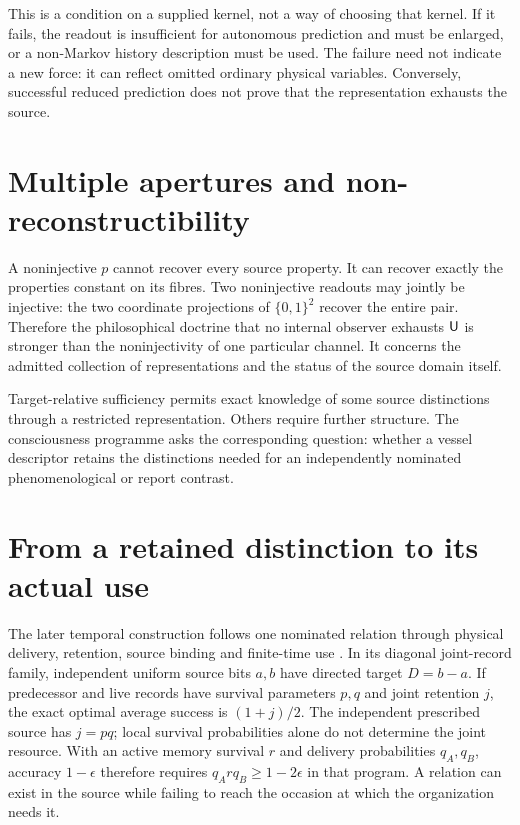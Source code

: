 This is a condition on a supplied kernel, not a way of choosing that kernel. If it fails, the readout is insufficient for autonomous prediction and must be enlarged, or a non-Markov history description must be used. The failure need not indicate a new force: it can reflect omitted ordinary physical variables. Conversely, successful reduced prediction does not prove that the representation exhausts the source.

\section{Multiple apertures and non-reconstructibility}\label{section:source:multiple-apertures-and-non-reconstructibility}
A noninjective $p$ cannot recover every source property. It can recover exactly the properties constant on its fibres. Two noninjective readouts may jointly be injective: the two coordinate projections of $\{0,1\}^2$ recover the entire pair. Therefore the philosophical doctrine that no internal observer exhausts $\mathsf{U}$ is stronger than the noninjectivity of one particular channel. It concerns the admitted collection of representations and the status of the source domain itself.

Target-relative sufficiency permits exact knowledge of some source distinctions through a restricted representation. Others require further structure. The consciousness programme asks the corresponding question: whether a vessel descriptor retains the distinctions needed for an independently nominated phenomenological or report contrast.

\section{From a retained distinction to its actual use}\label{sec:source-to-use-update}
The later temporal construction follows one nominated relation through physical delivery, retention, source binding and finite-time use \cite{RodgersBlock2026}. In its diagonal joint-record family, independent uniform source bits $a,b$ have directed target $D=b-a$. If predecessor and live records have survival parameters $p,q$ and joint retention $j$, the exact optimal average success is $(1+j)/2$. The independent prescribed source has $j=pq$; local survival probabilities alone do not determine the joint resource. With an active memory survival $r$ and delivery probabilities $q_A,q_B$, accuracy $1-\epsilon$ therefore requires $q_A r q_B\ge1-2\epsilon$ in that program. A relation can exist in the source while failing to reach the occasion at which the organization needs it.

